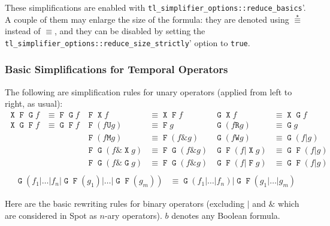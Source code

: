 \documentclass[a4paper,twoside,10pt,DIV=12]{scrreprt}
\DeclareMathOperator{\F}{\texttt{F}}
\DeclareMathOperator{\G}{\texttt{G}}
\newcommand{\U}{\mathbin{\texttt{U}}}
\newcommand{\R}{\mathbin{\texttt{R}}}
\DeclareMathOperator{\X}{\texttt{X}}
\newcommand{\M}{\mathbin{\texttt{M}}}
\newcommand{\W}{\mathbin{\texttt{W}}}
\newcommand{\OR}{\mathbin{\texttt{|}}}
\newcommand{\AND}{\mathbin{\texttt{\&}}}
\newcommand{\0}{\texttt{0}}
\newcommand{\1}{\texttt{1}}
\newcommand{\equiV}{\stackrel{\star}{\equiv}}
\begin{document}
These simplifications are enabled with
\verb|tl_simplifier_options::reduce_basics|'.  A couple of them may
enlarge the size of the formula: they are denoted using $\equiV$
instead of $\equiv$, and they can be disabled by setting the
\verb|tl_simplifier_options::reduce_size_strictly|' option to
\texttt{true}.

\subsubsection{Basic Simplifications for Temporal Operators}
\label{sec:basic-simp-ltl}

The following are simplification rules for unary operators (applied
from left to right, as usual):
\begin{align*}
  \X\F\G f & \equiv \F\G f & \F\X f           & \equiv \X\F f        & \G\X f          & \equiv \X\G f       \\
  \X\G\F f & \equiv \G\F f & \F(f\U g)        & \equiv \F g          & \G(f \R g)      & \equiv \G g         \\
           &               & \F(f\M g)        & \equiv \F (f\AND g)  & \G(f \W g)      & \equiv \G(f\OR g)   \\
           &               & \F\G(f\AND \X g) & \equiv \F\G(f\AND g) & \G\F(f\OR \X g) & \equiv \G\F(f\OR g) \\
           &               & \F\G(f\AND \G g) & \equiv \F\G(f\AND g) & \G\F(f\OR \F g) & \equiv \G\F(f\OR g) \\
\end{align*}
\begin{align*}
  \G(f_1\OR\ldots\OR f_n \OR \G\F(g_1)\OR\ldots\OR \G\F(g_m)) & \equiv \G(f_1\OR\ldots\OR f_n)\OR \G\F(g_1\OR\ldots\OR g_m)
\end{align*}


Here are the basic rewriting rules for binary operators (excluding
$\OR$ and $\AND$ which are considered in Spot as $n$-ary operators).
$b$ denotes any Boolean formula.
\end{document}
